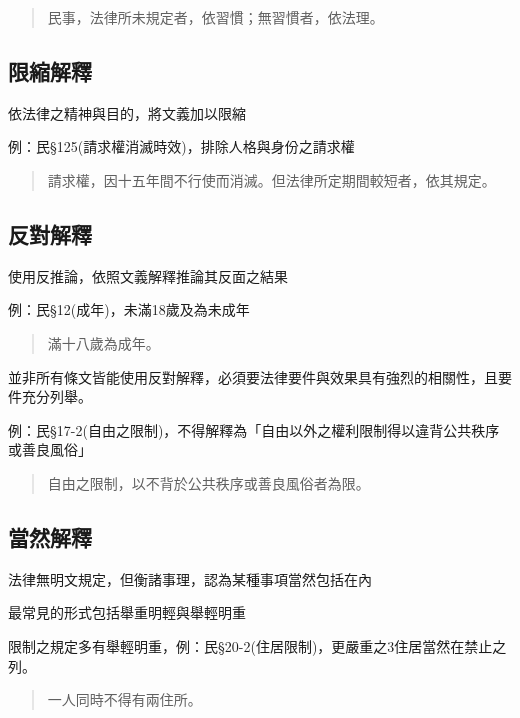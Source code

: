 \documentclass[
]{book}
\begin{document}
\begin{quote}
民事，法律所未規定者，依習慣；無習慣者，依法理。
\end{quote}

\hypertarget{ux9650ux7e2eux89e3ux91cb}{%
\subsection{限縮解釋}\label{ux9650ux7e2eux89e3ux91cb}}

依法律之精神與目的，將文義加以限縮

例：民§125(請求權消滅時效)，排除人格與身份之請求權

\begin{quote}
請求權，因十五年間不行使而消滅。但法律所定期間較短者，依其規定。
\end{quote}

\hypertarget{ux53cdux5c0dux89e3ux91cb}{%
\subsection{反對解釋}\label{ux53cdux5c0dux89e3ux91cb}}

使用反推論，依照文義解釋推論其反面之結果

例：民§12(成年)，未滿18歲及為未成年

\begin{quote}
滿十八歲為成年。
\end{quote}

並非所有條文皆能使用反對解釋，必須要法律要件與效果具有強烈的相關性，且要件充分列舉。

例：民§17-2(自由之限制)，不得解釋為「自由以外之權利限制得以違背公共秩序或善良風俗」

\begin{quote}
自由之限制，以不背於公共秩序或善良風俗者為限。
\end{quote}

\hypertarget{ux7576ux7136ux89e3ux91cb}{%
\subsection{當然解釋}\label{ux7576ux7136ux89e3ux91cb}}

法律無明文規定，但衡諸事理，認為某種事項當然包括在內

最常見的形式包括舉重明輕與舉輕明重

限制之規定多有舉輕明重，例：民§20-2(住居限制)，更嚴重之3住居當然在禁止之列。

\begin{quote}
一人同時不得有兩住所。
\end{quote}
\end{document}
